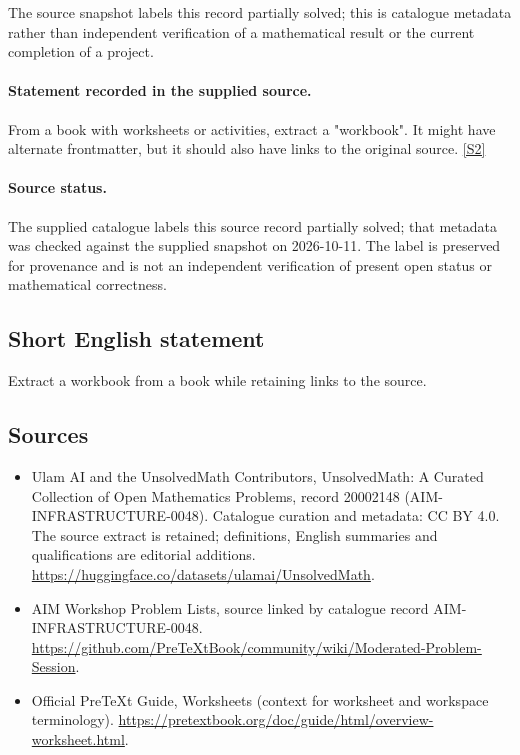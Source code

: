 \documentclass[11pt]{article}
\begin{document}
The source snapshot labels this record partially solved; this is catalogue metadata rather than independent verification of a mathematical result or the current completion of a project.
\paragraph{Statement recorded in the supplied source.}
From a book with worksheets or activities, extract a "workbook". It might have alternate frontmatter, but it should also have links to the original source. \href{https://github.com/PreTeXtBook/community/wiki/Moderated-Problem-Session}{[S2]}
\paragraph{Source status.}
The supplied catalogue labels this source record partially solved; that metadata was checked against the supplied snapshot on 2026-10-11. The label is preserved for provenance and is not an independent verification of present open status or mathematical correctness.
\subsection{Short English statement}
Extract a workbook from a book while retaining links to the source.
\subsection{Sources}
\begin{itemize}
\item[S1] Ulam AI and the UnsolvedMath Contributors, UnsolvedMath: A Curated Collection of Open Mathematics Problems, record 20002148 (AIM-INFRASTRUCTURE-0048). Catalogue curation and metadata: CC BY 4.0. The source extract is retained; definitions, English summaries and qualifications are editorial additions.
\url{https://huggingface.co/datasets/ulamai/UnsolvedMath}.
\item[S2] AIM Workshop Problem Lists, source linked by catalogue record AIM-INFRASTRUCTURE-0048.
\url{https://github.com/PreTeXtBook/community/wiki/Moderated-Problem-Session}.
\item[S3] Official PreTeXt Guide, Worksheets (context for worksheet and workspace terminology).
\url{https://pretextbook.org/doc/guide/html/overview-worksheet.html}.
\end{itemize}
\end{document}
